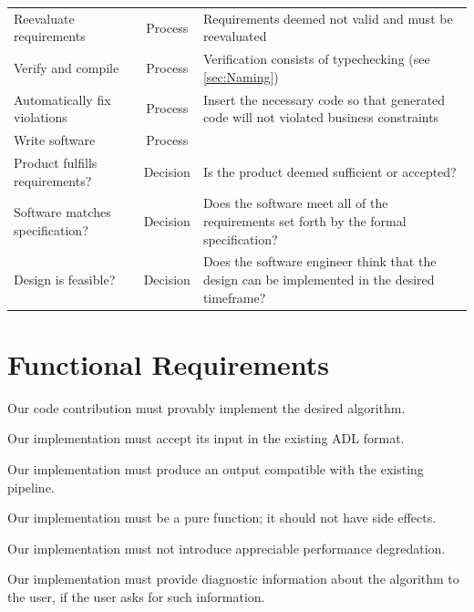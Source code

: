 \documentclass[12pt]{report}
\begin{document}
\begin{tabularx}{1.2\textwidth}{lcX}
Reevaluate requirements & Process & Requirements deemed not valid and must be reevaluated \\[6pt]
Verify and compile & Process & Verification consists of typechecking (see \ref{sec:Naming}) \\[6pt]
Automatically fix violations & Process & Insert the necessary code so that
  generated code will not violated business constraints \\[6pt]
Write software & Process & \\[6pt]
Product  fulfills requirements? & Decision & Is the product deemed sufficient or accepted? \\[6pt]
Software matches specification? & Decision & Does the software meet all of the
  requirements set forth by the formal specification? \\[6pt]
Design is feasible? & Decision & Does the software engineer think that the
  design can be implemented in the desired timeframe? \\[6pt]

\bottomrule 
\end{tabularx}

%

\section{Functional Requirements}\label{sec:Functional}
Our code contribution must provably implement the desired algorithm.

Our implementation must accept its input in the existing ADL format.

Our implementation must produce an output compatible with the existing pipeline. 

Our implementation must be a pure function; it should not have side effects.  

Our implementation must not introduce appreciable performance degredation. 

Our implementation must provide diagnostic information about the algorithm to
the user, if the user asks for such information.


\end{document}
